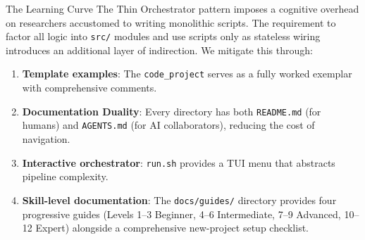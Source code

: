 \documentclass[
  ignorenonframetext,
]{beamer}
\providecommand{\tightlist}{%
  \setlength{\itemsep}{0pt}\setlength{\parskip}{0pt}}
\begin{document}
\begin{frame}[fragile]{The Learning Curve}
\protect{}\label{the-learning-curve}
The Thin Orchestrator pattern imposes a cognitive overhead on
researchers accustomed to writing monolithic scripts. The requirement to
factor all logic into \texttt{src/} modules and use scripts only as
stateless wiring introduces an additional layer of indirection. We
mitigate this through:

\begin{enumerate}
\tightlist
\item
  \textbf{Template examples}: The \texttt{code\_project} serves as a
  fully worked exemplar with comprehensive comments.
\item
  \textbf{Documentation Duality}: Every directory has both
  \texttt{README.md} (for humans) and \texttt{AGENTS.md} (for AI
  collaborators), reducing the cost of navigation.
\item
  \textbf{Interactive orchestrator}: \texttt{run.sh} provides a TUI menu
  that abstracts pipeline complexity.
\item
  \textbf{Skill-level documentation}: The \texttt{docs/guides/}
  directory provides four progressive guides (Levels 1--3 Beginner, 4--6
  Intermediate, 7--9 Advanced, 10--12 Expert) alongside a comprehensive
  new-project setup checklist.
\end{enumerate}
\end{frame}
\end{document}
